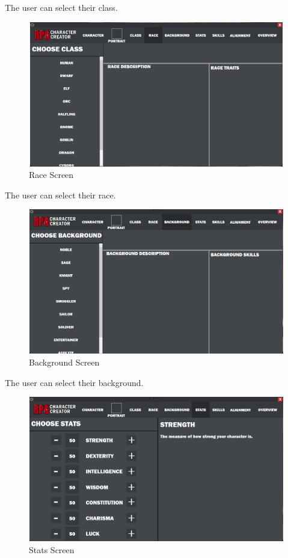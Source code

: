 \documentclass[10pt,conference,onecolumn,compsoc]{IEEEtran}
\begin{document}
The user can select their class.
\begin{figure}[H]
\includegraphics[height=240px, width=426px]{Finished Interface/raceScreen.png}
\caption{Race Screen}
\centering
\end{figure}
The user can select their race.
\begin{figure}[H]
\includegraphics[height=240px, width=426px]{Finished Interface/backgroundScreen.png}
\caption{Background Screen}
\centering
\end{figure}
The user can select their background.
\begin{figure}[H]
\includegraphics[height=240px, width=426px]{Finished Interface/statsScreen.png}
\caption{Stats Screen}
\centering
\end{figure}
\end{document}
